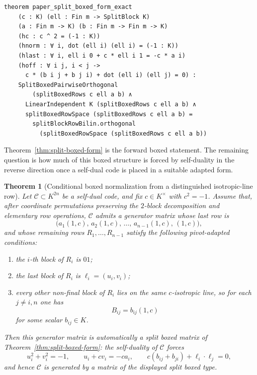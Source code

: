 \documentclass[12pt]{article}
\newtheorem{theorem}{Theorem}[section]
\begin{document}
\begin{lstlisting}[caption={Lean for Theorem~\ref{thm:split-boxed-form}.}]
theorem paper_split_boxed_form_exact
    (c : K) (ell : Fin m -> SplitBlock K)
    (a : Fin m -> K) (b : Fin m -> Fin m -> K)
    (hc : c ^ 2 = (-1 : K))
    (hnorm : ∀ i, dot (ell i) (ell i) = (-1 : K))
    (hlast : ∀ i, ell i 0 + c * ell i 1 = -c * a i)
    (hoff : ∀ i j, i < j ->
      c * (b i j + b j i) + dot (ell i) (ell j) = 0) :
    SplitBoxedPairwiseOrthogonal
        (splitBoxedRows c ell a b) ∧
      LinearIndependent K (splitBoxedRows c ell a b) ∧
      splitBoxedRowSpace (splitBoxedRows c ell a b) =
        splitBlockRowBilin.orthogonal
          (splitBoxedRowSpace (splitBoxedRows c ell a b))
\end{lstlisting}

\medskip

Theorem~\ref{thm:split-boxed-form} is the forward boxed statement. The remaining question is how much of this boxed structure is forced by self-duality in the reverse direction once a self-dual code is placed in a suitable adapted form.

\begin{theorem}[Conditional boxed normalization from a distinguished isotropic-line row]
\label{thm:conditional-split-boxed-normalization}
Let \(\mathcal C\subset K^{2n}\) be a self-dual code, and fix \(c\in K^\times\) with \(c^2=-1\). Assume that, after coordinate permutations preserving the \(2\)-block decomposition and elementary row operations, \(\mathcal C\) admits a generator matrix whose last row is
\[
\bigl(a_1(1,c),\,a_2(1,c),\,\dots,\,a_{n-1}(1,c),\,(1,c)\bigr),
\]
and whose remaining rows \(R_1,\dots,R_{n-1}\) satisfy the following pivot-adapted conditions:
\begin{enumerate}
\item the \(i\)-th block of \(R_i\) is \(01\);
\item the last block of \(R_i\) is \(\ell_i=(u_i,v_i)\);
\item every other non-final block of \(R_i\) lies on the same \(c\)-isotropic line, so for each \(j\neq i,n\) one has
\[
B_{ij}=b_{ij}(1,c)
\]
for some scalar \(b_{ij}\in K\).
\end{enumerate}
Then this generator matrix is automatically a split boxed matrix of Theorem~\ref{thm:split-boxed-form}: the self-duality of \(\mathcal C\) forces
\[
u_i^2+v_i^2=-1,
\qquad
u_i+c v_i=-c a_i,
\qquad
c(b_{ij}+b_{ji})+\ell_i\cdot \ell_j=0,
\]
and hence \(\mathcal C\) is generated by a matrix of the displayed split boxed type.
\end{theorem}
\end{document}
